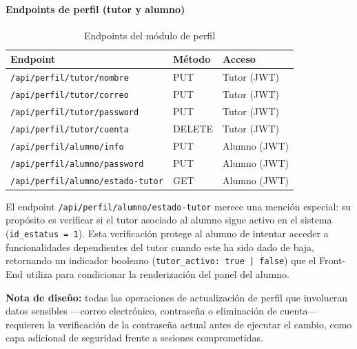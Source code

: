 \paragraph{Endpoints de perfil (tutor y alumno)}

\begin{table}[H]
\centering
\caption{Endpoints del módulo de perfil}
\label{tab:endpoints-perfil}
\begin{tabular}{|l|l|l|}
\hline
\textbf{Endpoint} & \textbf{Método} & \textbf{Acceso} \\
\hline
\texttt{/api/perfil/tutor/nombre}             & PUT    & Tutor (JWT) \\
\texttt{/api/perfil/tutor/correo}             & PUT    & Tutor (JWT) \\
\texttt{/api/perfil/tutor/password}           & PUT    & Tutor (JWT) \\
\texttt{/api/perfil/tutor/cuenta}             & DELETE & Tutor (JWT) \\
\texttt{/api/perfil/alumno/info}              & PUT    & Alumno (JWT) \\
\texttt{/api/perfil/alumno/password}          & PUT    & Alumno (JWT) \\
\texttt{/api/perfil/alumno/estado-tutor}      & GET    & Alumno (JWT) \\
\hline
\end{tabular}
\end{table}

El endpoint \texttt{/api/perfil/alumno/estado-tutor} merece una mención
especial: su propósito es verificar si el tutor asociado al alumno
sigue activo en el sistema (\texttt{id\_estatus = 1}). Esta verificación
protege al alumno de intentar acceder a funcionalidades dependientes
del tutor cuando este ha sido dado de baja, retornando un indicador
booleano (\texttt{tutor\_activo: true | false}) que el Front-End
utiliza para condicionar la renderización del panel del alumno.

\noindent\textbf{Nota de diseño:} todas las operaciones de actualización
de perfil que involucran datos sensibles —correo electrónico, contraseña
o eliminación de cuenta— requieren la verificación de la contraseña
actual antes de ejecutar el cambio, como capa adicional de seguridad
frente a sesiones comprometidas.